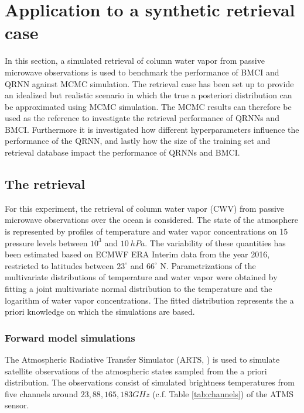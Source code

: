 \documentclass[journal abbreviation, manuscript]{copernicus}
\begin{document}
\section{Application to a synthetic retrieval case}
\label{sec:synthetic}

In this section, a simulated retrieval of column water vapor from passive
microwave observations is used to benchmark the performance of BMCI and QRNN
against MCMC simulation. The retrieval case has been set up to provide an
idealized but realistic scenario in which the true a posteriori distribution can
be approximated using MCMC simulation. The MCMC results can therefore be used as
the reference to investigate the retrieval performance of QRNNs and BMCI. Furthermore
it is investigated how different hyperparameters influence the performance of
the QRNN, and lastly how the size of the training set and retrieval database
impact the performance of QRNNs and BMCI.

\subsection{The retrieval}

   For this experiment, the retrieval of column water vapor (CWV) from passive
   microwave observations over the ocean is considered. The state of the
   atmosphere is represented by profiles of temperature and water vapor
   concentrations on 15 pressure levels between $10^3$ and $10\:\unit{hPa}$. The
   variability of these quantities has been estimated based on ECMWF ERA
   Interim data \citep{era_interim} from the year 2016, restricted to latitudes
   between $23^\circ$ and $66^\circ$ N. Parametrizations of the multivariate
   distributions of temperature and water vapor were obtained by fitting a joint
   multivariate normal distribution to the temperature and the logarithm of
   water vapor concentrations. The fitted distribution represents the a priori
   knowledge on which the simulations are based.

\subsubsection{Forward model simulations}

   The Atmospheric Radiative Transfer Simulator (ARTS, \citet{arts_new}) is used to
   simulate satellite observations of the atmospheric states sampled from the a
   priori distribution. The observations consist of simulated brightness
   temperatures from five channels around $23, 88, 165, 183 \unit{GHz}$
   (c.f. Table \ref{tab:channels}) of the ATMS sensor.
\end{document}
